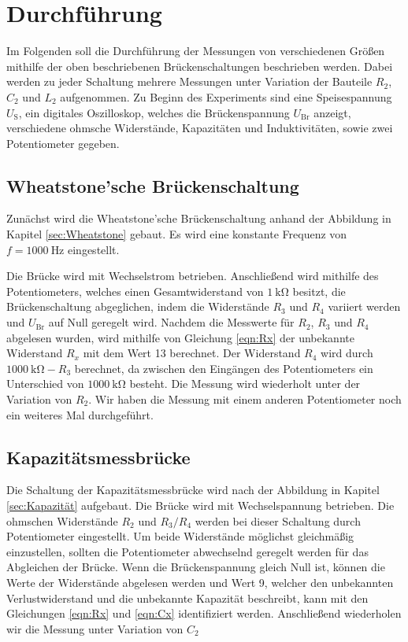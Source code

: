 \section{Durchführung} \label{sec:Durchführung}

    Im Folgenden soll die Durchführung der Messungen von verschiedenen Größen mithilfe der oben beschriebenen
    Brückenschaltungen beschrieben werden.
    Dabei werden zu jeder Schaltung mehrere Messungen unter Variation der Bauteile
    $R_2$, $C_2$ und $L_2$ aufgenommen.
    Zu Beginn des Experiments sind eine Speisespannung $U_\text{S}$, ein digitales Oszilloskop, welches die
    Brückenspannung $U_\text{Br}$ anzeigt, verschiedene ohmsche Widerstände, Kapazitäten und Induktivitäten, sowie
    zwei Potentiometer gegeben.

\subsection{Wheatstone'sche Brückenschaltung}

    Zunächst wird die Wheatstone'sche Brückenschaltung anhand der Abbildung in Kapitel \ref{sec:Wheatstone} gebaut.
    Es wird eine konstante Frequenz von $f = \SI{1000}{\hertz}$ eingestellt.

    Die Brücke wird mit Wechselstrom betrieben.
    Anschließend wird mithilfe des Potentiometers, welches einen Gesamtwiderstand von $\SI{1}{\kilo\ohm}$ besitzt,
    die Brückenschaltung abgeglichen, indem
    die Widerstände $R_3$ und $R_4$ variiert werden und $U_\text{Br}$ auf Null geregelt wird.
    Nachdem die Messwerte für $R_2$, $R_3$ und $R_4$ abgelesen wurden, wird mithilfe von Gleichung \eqref{eqn:Rx}
    der unbekannte Widerstand $R_x$ mit dem Wert 13 berechnet.
    Der Widerstand $R_4$ wird durch $\SI{1000}{\kilo\ohm}-R_3$ berechnet, da zwischen den Eingängen des
    Potentiometers ein Unterschied von $\SI{1000}{\kilo\ohm}$ besteht.
    Die Messung wird wiederholt unter der Variation von $R_2$.
    Wir haben die Messung mit einem anderen Potentiometer noch ein weiteres Mal durchgeführt.

\subsection{Kapazitätsmessbrücke}

    Die Schaltung der Kapazitätsmessbrücke wird nach der Abbildung in Kapitel \ref{sec:Kapazität} aufgebaut.
    Die Brücke wird mit Wechselspannung betrieben.
    Die ohmschen Widerstände $R_2$ und $R_3/R_4$ werden bei dieser Schaltung durch Potentiometer eingestellt.
    Um beide Widerstände möglichst gleichmäßig einzustellen, sollten die Potentiometer abwechselnd geregelt werden
    für das Abgleichen der Brücke.
    Wenn die Brückenspannung gleich Null ist, können die Werte der Widerstände abgelesen werden und Wert 9,
    welcher den unbekannten Verlustwiderstand und die unbekannte Kapazität beschreibt, kann mit den Gleichungen 
    \eqref{eqn:Rx} und \eqref{eqn:Cx} identifiziert werden.
    Anschließend wiederholen wir die Messung unter Variation von $C_2$ 

